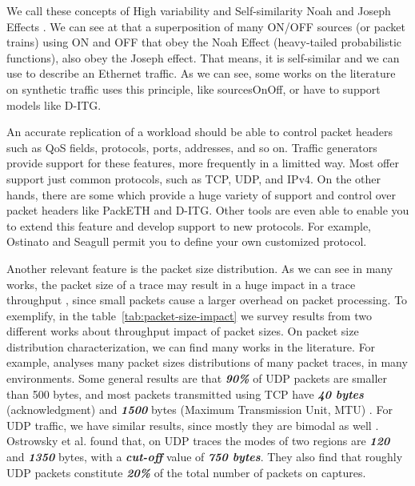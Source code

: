 We call these concepts of High variability and Self-similarity Noah and Joseph Effects \cite{selfsimilar-highvariability}. We can see at\cite{selfsimilar-highvariability} that a superposition of many ON/OFF sources (or packet trains) using ON and OFF that obey the Noah Effect (heavy-tailed probabilistic functions), also obey the Joseph effect. That means, it is self-similar and we can use to describe an Ethernet traffic. As we can see, some works on the literature on synthetic traffic uses this principle, like sourcesOnOff\cite{sourcesonoff-paper}, or have to support models like D-ITG\cite{ditg-paper}.


An accurate replication of a workload should be able to control packet headers such as QoS fields, protocols, ports, addresses, and so on. Traffic generators provide support for these features, more frequently in a limitted way. Most offer support just common protocols, such as TCP, UDP, and IPv4. On the other hands, there are some which provide a huge variety of support and control over packet headers like PackETH\cite{web-packeth} and D-ITG. Other tools are even able to enable you to extend this feature and develop support to new protocols. For example, Ostinato and Seagull permit you to define your own customized protocol.


Another relevant feature is the packet size distribution. As we can see in many works, the packet size of a trace may result in a huge impact in a trace throughput \cite{stochartic-selfsimilar}\cite{performance-trafficgen}, since small packets cause a larger overhead on packet processing. To exemplify, in the table~\ref{tab:packet-size-impact} we survey results from two different works \cite{comparative-trafficgen-tools} \cite{performance-trafficgen} about throughput impact of packet sizes. On packet size distribution characterization, we can find many works in the literature. For example, \cite{packet-distribution-model} analyses many packet sizes distributions of many packet traces, in many environments. Some general results are that \textbf{\textit{90\%}} of UDP packets are smaller than 500 bytes, and most packets transmitted using TCP have \textbf{\textit{40 bytes}} (acknowledgment) and \textbf{\textit{1500}} bytes (Maximum Transmission Unit, MTU) \cite{packet-distribution-model}. For UDP traffic, we have similar results, since mostly they are bimodal as well \cite{udp-flows-model}. Ostrowsky et al.\cite{udp-flows-model} found that, on UDP traces the modes of two regions are \textbf{\textit{120}} and \textbf{\textit{1350}} bytes, with a \textbf{\textit{cut-off}} value of \textbf{\textit{750 bytes}}. They also find that roughly UDP packets constitute \textbf{\textit{20\%}} of the total number of packets on captures. 


